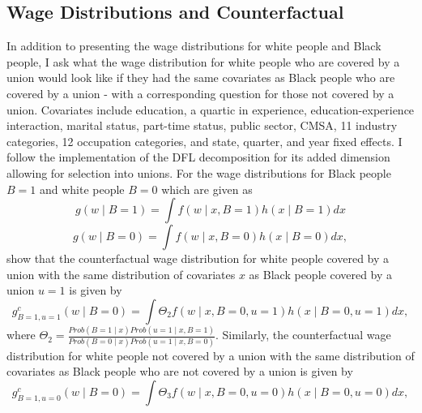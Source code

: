 \documentclass[11pt]{article}
\begin{document}
\subsection{Wage Distributions and Counterfactual}
In addition to presenting the wage distributions for white people and Black people, I ask what the wage distribution for white people who are covered by a union would look like if they had the same covariates as Black people who are covered by a union - with a corresponding question for those not covered by a union. Covariates include education, a quartic in experience, education-experience interaction, marital status, part-time status, public sector, CMSA, 11 industry categories, 12 occupation categories, and state, quarter, and year fixed effects. I follow the \citet{heywoodparent2012} implementation of the DFL decomposition for its added dimension allowing for selection into unions. For the wage distributions for Black people $B = 1$ and white people $B = 0$ which are given as 
\begin{equation}
    g(w\mid B = 1) = \int f(w\mid x, B = 1) h(x \mid B = 1) dx
\end{equation}
\begin{equation}
    g(w\mid B = 0) = \int f(w\mid x, B = 0) h(x \mid B = 0) dx,
\end{equation}
\citet{heywoodparent2012} show that the counterfactual wage distribution for white people covered by a union with the same distribution of covariates $x$ as Black people covered by a union $u = 1$ is given by
\begin{equation}
g^c_{B=1, u = 1}(w\mid B = 0) = \int \Theta_2 f(w\mid x, B = 0, u = 1)h(x\mid B = 0, u = 1)dx,
\end{equation}
where $\Theta_2 = \frac{Prob(B = 1\mid x) Prob(u = 1\mid x, B = 1)}{Prob(B = 0\mid x)Prob(u = 1\mid x, B = 0)}$. 
Similarly, the counterfactual wage distribution for white people not covered by a union with the same distribution of covariates as Black people who are not covered by a union is given by
\begin{equation}
g^c_{B=1, u = 0}(w\mid B = 0) = \int \Theta_3 f(w\mid x, B = 0, u = 0)h(x\mid B = 0, u = 0)dx,
\end{equation}
\end{document}
